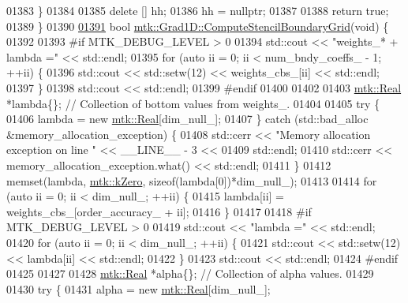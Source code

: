 \begin{DoxyCode}
{{01383   \}
01384 
01385   \textcolor{keyword}{delete} [] hh;
01386   hh = \textcolor{keyword}{nullptr};
01387 
01388   \textcolor{keywordflow}{return} \textcolor{keyword}{true};
01389 \}
01390 
\hypertarget{mtk__grad__1d_8cc_source_l01391}{}\hyperlink{classmtk_1_1Grad1D_a7ad1cecf6b52647263208ffaea0ee1e5}{01391} \textcolor{keywordtype}{bool} \hyperlink{classmtk_1_1Grad1D_a7ad1cecf6b52647263208ffaea0ee1e5}{mtk::Grad1D::ComputeStencilBoundaryGrid}(\textcolor{keywordtype}{void}) \{
01392 
01393 \textcolor{preprocessor}{  #if MTK\_DEBUG\_LEVEL > 0}
01394   std::cout << \textcolor{stringliteral}{"weights\_* + lambda ="} << std::endl;
01395   \textcolor{keywordflow}{for} (\textcolor{keyword}{auto} ii = 0; ii < num\_bndy\_coeffs\_ - 1; ++ii) \{
01396     std::cout << std::setw(12) << weights\_cbs\_[ii] << std::endl;
01397   \}
01398   std::cout << std::endl;
01399 \textcolor{preprocessor}{  #endif}
01400 
01402 
01403   \hyperlink{group__c01-roots_gac080bbbf5cbb5502c9f00405f894857d}{mtk::Real} *lambda\{\}; \textcolor{comment}{// Collection of bottom values from weights\_.}
01404 
01405   \textcolor{keywordflow}{try} \{
01406     lambda = \textcolor{keyword}{new} \hyperlink{group__c01-roots_gac080bbbf5cbb5502c9f00405f894857d}{mtk::Real}[dim\_null\_];
01407   \} \textcolor{keywordflow}{catch} (std::bad\_alloc &memory\_allocation\_exception) \{
01408     std::cerr << \textcolor{stringliteral}{"Memory allocation exception on line "} << \_\_LINE\_\_ - 3 <<
01409       std::endl;
01410     std::cerr << memory\_allocation\_exception.what() << std::endl;
01411   \}
01412   memset(lambda, \hyperlink{group__c01-roots_ga59a451a5fae30d59649bcda274fea271}{mtk::kZero}, \textcolor{keyword}{sizeof}(lambda[0])*dim\_null\_);
01413 
01414   \textcolor{keywordflow}{for} (\textcolor{keyword}{auto} ii = 0; ii < dim\_null\_; ++ii) \{
01415     lambda[ii] = weights\_cbs\_[order\_accuracy\_ + ii];
01416   \}
01417 
01418 \textcolor{preprocessor}{  #if MTK\_DEBUG\_LEVEL > 0}
01419   std::cout << \textcolor{stringliteral}{"lambda ="} << std::endl;
01420   \textcolor{keywordflow}{for} (\textcolor{keyword}{auto} ii = 0; ii < dim\_null\_; ++ii) \{
01421     std::cout << std::setw(12) << lambda[ii] << std::endl;
01422   \}
01423   std::cout << std::endl;
01424 \textcolor{preprocessor}{  #endif}
01425 
01427 
01428   \hyperlink{group__c01-roots_gac080bbbf5cbb5502c9f00405f894857d}{mtk::Real} *alpha\{\}; \textcolor{comment}{// Collection of alpha values.}
01429 
01430   \textcolor{keywordflow}{try} \{
01431     alpha = \textcolor{keyword}{new} \hyperlink{group__c01-roots_gac080bbbf5cbb5502c9f00405f894857d}{mtk::Real}[dim\_null\_];
}}
\end{DoxyCode}
